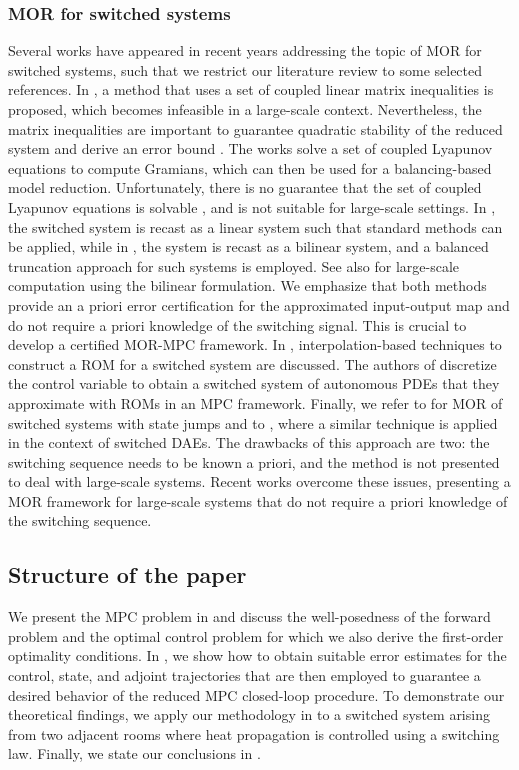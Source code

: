 \documentclass[reqno]{amsart}
\newcommand{\abbr}[1]{\textsf{#1}\xspace}
\newcommand{\DAE}{\abbr{DAE}}
\newcommand{\PDEs}{\abbr{PDEs}}
\newcommand{\ROM}{\abbr{ROM}}
\newcommand{\ROMs}{\abbr{ROMs}}
\newcommand{\MPC}{\abbr{MPC}}
\newcommand{\MOR}{\abbr{MOR}}
\begin{document}
\subsubsection{\MOR for switched systems}
Several works have appeared in recent years addressing the topic of \MOR for switched systems, such that we restrict our literature review to some selected references. In \cite{Wu2009}, a method that uses a set of coupled linear matrix inequalities is proposed, which becomes infeasible in a large-scale context. Nevertheless, the matrix inequalities are important to guarantee quadratic stability of the reduced system and derive an error bound \cite{Petreczky2013}. The works \cite{GosPAF18,Shaker2012} solve a set of coupled Lyapunov equations to compute Gramians, which can then be used for a balancing-based model reduction. Unfortunately, there is no guarantee that the set of coupled Lyapunov equations is solvable \cite{Liberzon2003}, and is not suitable for large-scale settings. In \cite{SchU18}, the switched system is recast as a linear system such that standard methods can be applied, while in \cite{PontesDuff2020}, the system is recast as a bilinear system, and a balanced truncation approach for such systems is employed. See also \cite{ManU24} for large-scale computation using the bilinear formulation. We emphasize that both methods provide an a priori error certification for the approximated input-output map and do not require a priori knowledge of the switching signal. This is crucial to develop a certified \MOR-\MPC framework. In \cite{Bastug2016}, interpolation-based techniques to construct a \ROM for a switched system are discussed. The authors of  \cite{Peitz2019} discretize the control variable to obtain a switched system of autonomous \PDEs that they approximate with \ROMs in an \MPC framework. Finally, we refer to \cite{Hossain2024} for \MOR of switched systems with state jumps and to \cite{Hossain2023}, where a similar technique is applied in the context of switched {\DAE}s. The drawbacks of this approach are two: the switching sequence needs to be known a priori, and the method is not presented to deal with large-scale systems. Recent works \cite{ManU24,ManU24b} overcome these issues, presenting a \MOR framework for large-scale systems that do not require a priori knowledge of the switching sequence.
%
\subsection{Structure of the paper}
We present the \MPC problem in  and discuss the well-posedness of the forward problem and the optimal control problem for which we also derive the first-order optimality conditions. In , we show how to obtain suitable error estimates for the control, state, and adjoint trajectories that are then employed to guarantee a desired behavior of the reduced \MPC closed-loop procedure. To demonstrate our theoretical findings, we apply our methodology in  to a switched system arising from two adjacent rooms where heat propagation is controlled using a switching law. Finally, we state our conclusions in .
%
\end{document}
